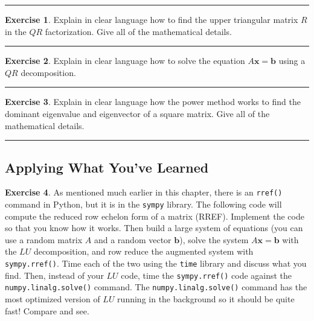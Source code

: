 \documentclass[
]{book}
\theoremstyle{definition}
\theoremstyle{definition}
\theoremstyle{definition}
\newtheorem{exercise}{Exercise}[chapter]
\theoremstyle{remark}
\begin{document}
\begin{center}\rule{0.5\linewidth}{0.5pt}\end{center}

\begin{exercise}
\protect\hypertarget{exr:unnamed-chunk-378}{}{\label{exr:unnamed-chunk-378} }Explain in clear language how to find the upper triangular matrix \(R\) in the \(QR\) factorization. Give all of the mathematical details.
\end{exercise}

\begin{center}\rule{0.5\linewidth}{0.5pt}\end{center}

\begin{exercise}
\protect\hypertarget{exr:unnamed-chunk-379}{}{\label{exr:unnamed-chunk-379} }Explain in clear language how to solve the equation \(A \boldsymbol{x} = \boldsymbol{b}\) using a \(QR\) decomposition.
\end{exercise}

\begin{center}\rule{0.5\linewidth}{0.5pt}\end{center}

\begin{exercise}
\protect\hypertarget{exr:unnamed-chunk-380}{}{\label{exr:unnamed-chunk-380} }Explain in clear language how the power method works to find the dominant eigenvalue and eigenvector of a square matrix. Give all of the mathematical details.
\end{exercise}

\begin{center}\rule{0.5\linewidth}{0.5pt}\end{center}

\hypertarget{applying-what-youve-learned-3}{%
\subsection{Applying What You've Learned}\label{applying-what-youve-learned-3}}

\begin{exercise}
\protect\hypertarget{exr:unnamed-chunk-381}{}{\label{exr:unnamed-chunk-381} }As mentioned much earlier in this chapter, there is an \texttt{rref()} command in Python, but it is in the \texttt{sympy} library. The following code will compute the reduced row echelon form of a matrix (RREF). Implement the code so that you know how it works. Then build a large system of equations (you can use a random matrix \(A\) and a random vector \(\boldsymbol{b}\)), solve the system \(A \boldsymbol{x} = \boldsymbol{b}\) with the \(LU\) decomposition, and row reduce the augmented system with \texttt{sympy.rref()}. Time each of the two using the \texttt{time} library and discuss what you find. Then, instead of your \(LU\) code, time the \texttt{sympy.rref()} code against the \texttt{numpy.linalg.solve()} command. The \texttt{numpy.linalg.solve()} command has the most optimized version of \(LU\) running in the background so it should be quite fast! Compare and see.
\end{exercise}
\end{document}
